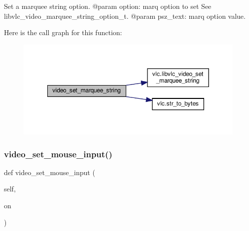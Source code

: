 \begin{DoxyVerb}Set a marquee string option.
@param option: marq option to set See libvlc_video_marquee_string_option_t.
@param psz_text: marq option value.
\end{DoxyVerb}
 Here is the call graph for this function\+:
\nopagebreak
\begin{figure}[H]
\begin{center}
\leavevmode
\includegraphics[width=349pt]{classvlc_1_1_media_player_a492db72b13ac08ae28e4672ca1e8fd92_cgraph}
\end{center}
\end{figure}
\mbox{\label{classvlc_1_1_media_player_a7f6d6677a1da3c8af7bdb6b4e030a857}} 
\subsubsection{\texorpdfstring{video\+\_\+set\+\_\+mouse\+\_\+input()}{video\_set\_mouse\_input()}}
{\footnotesize\ttfamily def video\+\_\+set\+\_\+mouse\+\_\+input (\begin{DoxyParamCaption}\item[{}]{self,  }\item[{}]{on }\end{DoxyParamCaption})}

